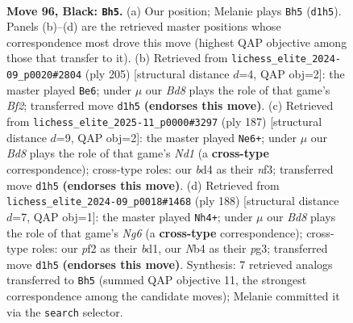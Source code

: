 \documentclass[11pt]{article}
\begin{document}
\clearpage

\begin{figure}[p]\centering
\begin{subfigure}{0.46\textwidth}\centering
\resizebox{\linewidth}{!}{%
\newchessgame
\chessboard[
  setfen={8/7k/8/8/1n1B1K2/8/5P2/3b4 b - - 38 96},
  showmover=false,
  pgfstyle=straightmove, color=movearrow, markmove={d1-h5}
]}
\caption{}
\end{subfigure}\hfill
\begin{subfigure}{0.46\textwidth}\centering
\resizebox{\linewidth}{!}{%
\newchessgame
\chessboard[
  setfen={8/5b2/5P2/8/3B4/8/3k4/1K6 b - - 20 103},
  showmover=false,
  pgfstyle=straightmove, color=movearrow, markmove={f7-e6}
]}
\caption{}
\end{subfigure}
\\[4pt]
\begin{subfigure}{0.46\textwidth}\centering
\resizebox{\linewidth}{!}{%
\newchessgame
\chessboard[
  setfen={3n4/6K1/3k2P1/8/8/5N2/8/8 b - - 54 94},
  showmover=false,
  pgfstyle=straightmove, color=movearrow, markmove={d8-e6}
]}
\caption{}
\end{subfigure}\hfill
\begin{subfigure}{0.46\textwidth}\centering
\resizebox{\linewidth}{!}{%
\newchessgame
\chessboard[
  setfen={8/8/6N1/8/3K4/5kp1/8/3b4 w - - 16 95},
  showmover=false,
  pgfstyle=straightmove, color=movearrow, markmove={g6-h4}
]}
\caption{}
\end{subfigure}
\caption{\textbf{Move 96, Black: \texttt{Bh5}.} (a) Our position; Melanie plays \texttt{Bh5} (\texttt{d1h5}). Panels (b)--(d) are the retrieved master positions whose correspondence most drove this move (highest QAP objective among those that transfer to it). (b) Retrieved from \texttt{lichess\_elite\_2024-09\_p0020\#2804} (ply 205) [structural distance $d$=4, QAP obj=2]: the master played \texttt{Be6}; under $\mu$ our \emph{Bd8} plays the role of that game's \emph{Bf2}; transferred move \texttt{d1h5} \textbf{(endorses this move)}. (c) Retrieved from \texttt{lichess\_elite\_2025-11\_p0000\#3297} (ply 187) [structural distance $d$=9, QAP obj=2]: the master played \texttt{Ne6+}; under $\mu$ our \emph{Bd8} plays the role of that game's \emph{Nd1} (a \textbf{cross-type} correspondence); cross-type roles: our \emph{b}d4 as their \emph{n}f3; transferred move \texttt{d1h5} \textbf{(endorses this move)}. (d) Retrieved from \texttt{lichess\_elite\_2024-09\_p0018\#1468} (ply 188) [structural distance $d$=7, QAP obj=1]: the master played \texttt{Nh4+}; under $\mu$ our \emph{Bd8} plays the role of that game's \emph{Ng6} (a \textbf{cross-type} correspondence); cross-type roles: our \emph{p}f2 as their \emph{b}d1, our \emph{N}b4 as their \emph{p}g3; transferred move \texttt{d1h5} \textbf{(endorses this move)}. Synthesis: 7 retrieved analogs transferred to \texttt{Bh5} (summed QAP objective 11, the strongest correspondence among the candidate moves); Melanie committed it via the \texttt{search} selector.}
\label{fig:thought-m191}
\end{figure}
\end{document}
